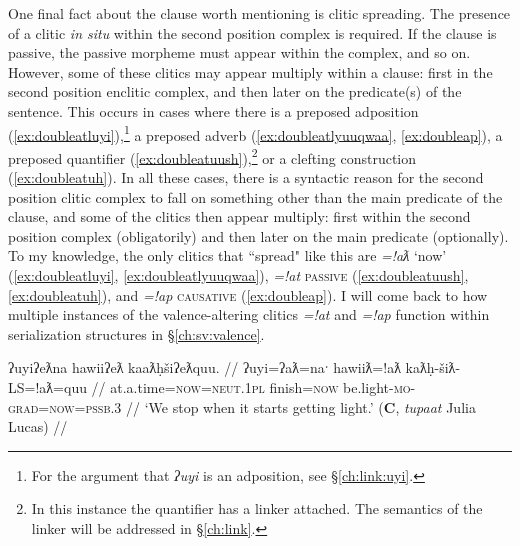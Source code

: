 One final fact about the clause worth mentioning is clitic spreading. The presence of a clitic \textit{in situ} within the second position complex is required. If the clause is passive, the passive morpheme must appear within the complex, and so on. However, some of these clitics may appear multiply within a clause: first in the second position enclitic complex, and then later on the predicate(s) of the sentence. This occurs in cases where there is a preposed adposition (\ref{ex:doubleatluyi}),\footnote{For the argument that \textit{ʔuyi} is an adposition, see \S\ref{ch:link:uyi}.} a preposed adverb (\ref{ex:doubleatlyuuqwaa}, \ref{ex:doubleap}), a preposed quantifier (\ref{ex:doubleatuush}),\footnote{In this instance the quantifier has a linker attached. The semantics of the linker will be addressed in \S\ref{ch:link}.} or a clefting construction (\ref{ex:doubleatuh}). In all these cases, there is a syntactic reason for the second position clitic complex to fall on something other than the main predicate of the clause, and some of the clitics then appear multiply: first within the second position complex (obligatorily) and then later on the main predicate (optionally). To my knowledge, the only clitics that ``spread" like this are \textit{=!aƛ} `now' (\ref{ex:doubleatluyi}, \ref{ex:doubleatlyuuqwaa}), \textit{=!at} \textsc{passive} (\ref{ex:doubleatuush}, \ref{ex:doubleatuh}), and \textit{=!ap} \textsc{causative} (\ref{ex:doubleap}). I will come back to how multiple instances of the valence-altering clitics \textit{=!at} and \textit{=!ap} function within serialization structures in \S\ref{ch:sv:valence}. %

\ex \label{ex:doubleatluyi}
\begingl
\glpreamble ʔuyiʔeƛna hawiiʔeƛ kaaƛḥšiʔeƛquu. //
\gla ʔuyi=ʔaƛ=naˑ hawiiƛ=!aƛ kaƛḥ-šiƛ-LS=!aƛ=quu  //
\glb at.a.time=\textsc{now}=\textsc{neut.1pl} finish=\textsc{now} be.light-\textsc{mo}-\textsc{grad}=\textsc{now}=\textsc{pssb.3} //
\glft `We stop when it starts getting light.' (\textbf{C}, \textit{tupaat} Julia Lucas) //
\endgl
\xe


